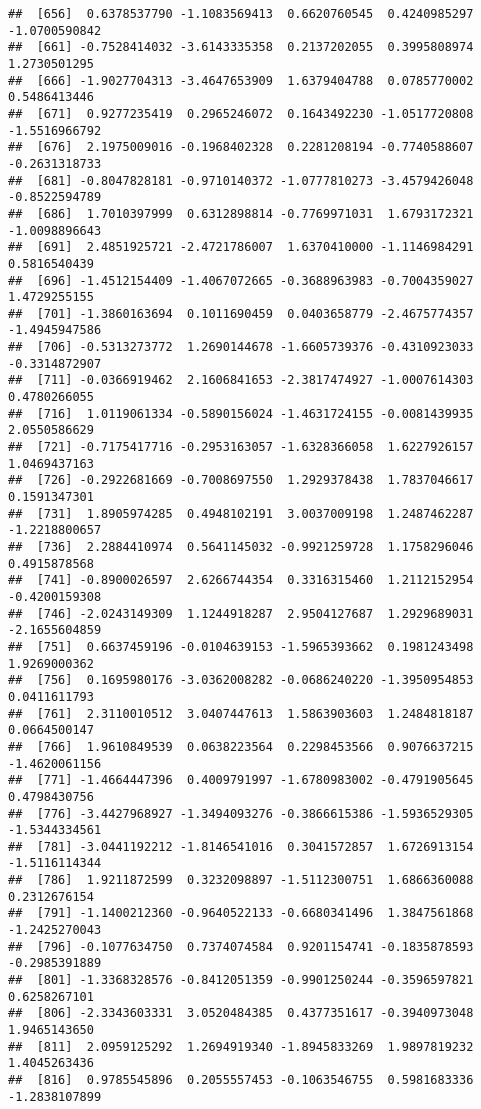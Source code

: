 \documentclass[
]{article}
\begin{document}
\begin{verbatim}
##  [656]  0.6378537790 -1.1083569413  0.6620760545  0.4240985297 -1.0700590842
##  [661] -0.7528414032 -3.6143335358  0.2137202055  0.3995808974  1.2730501295
##  [666] -1.9027704313 -3.4647653909  1.6379404788  0.0785770002  0.5486413446
##  [671]  0.9277235419  0.2965246072  0.1643492230 -1.0517720808 -1.5516966792
##  [676]  2.1975009016 -0.1968402328  0.2281208194 -0.7740588607 -0.2631318733
##  [681] -0.8047828181 -0.9710140372 -1.0777810273 -3.4579426048 -0.8522594789
##  [686]  1.7010397999  0.6312898814 -0.7769971031  1.6793172321 -1.0098896643
##  [691]  2.4851925721 -2.4721786007  1.6370410000 -1.1146984291  0.5816540439
##  [696] -1.4512154409 -1.4067072665 -0.3688963983 -0.7004359027  1.4729255155
##  [701] -1.3860163694  0.1011690459  0.0403658779 -2.4675774357 -1.4945947586
##  [706] -0.5313273772  1.2690144678 -1.6605739376 -0.4310923033 -0.3314872907
##  [711] -0.0366919462  2.1606841653 -2.3817474927 -1.0007614303  0.4780266055
##  [716]  1.0119061334 -0.5890156024 -1.4631724155 -0.0081439935  2.0550586629
##  [721] -0.7175417716 -0.2953163057 -1.6328366058  1.6227926157  1.0469437163
##  [726] -0.2922681669 -0.7008697550  1.2929378438  1.7837046617  0.1591347301
##  [731]  1.8905974285  0.4948102191  3.0037009198  1.2487462287 -1.2218800657
##  [736]  2.2884410974  0.5641145032 -0.9921259728  1.1758296046  0.4915878568
##  [741] -0.8900026597  2.6266744354  0.3316315460  1.2112152954 -0.4200159308
##  [746] -2.0243149309  1.1244918287  2.9504127687  1.2929689031 -2.1655604859
##  [751]  0.6637459196 -0.0104639153 -1.5965393662  0.1981243498  1.9269000362
##  [756]  0.1695980176 -3.0362008282 -0.0686240220 -1.3950954853  0.0411611793
##  [761]  2.3110010512  3.0407447613  1.5863903603  1.2484818187  0.0664500147
##  [766]  1.9610849539  0.0638223564  0.2298453566  0.9076637215 -1.4620061156
##  [771] -1.4664447396  0.4009791997 -1.6780983002 -0.4791905645  0.4798430756
##  [776] -3.4427968927 -1.3494093276 -0.3866615386 -1.5936529305 -1.5344334561
##  [781] -3.0441192212 -1.8146541016  0.3041572857  1.6726913154 -1.5116114344
##  [786]  1.9211872599  0.3232098897 -1.5112300751  1.6866360088  0.2312676154
##  [791] -1.1400212360 -0.9640522133 -0.6680341496  1.3847561868 -1.2425270043
##  [796] -0.1077634750  0.7374074584  0.9201154741 -0.1835878593 -0.2985391889
##  [801] -1.3368328576 -0.8412051359 -0.9901250244 -0.3596597821  0.6258267101
##  [806] -2.3343603331  3.0520484385  0.4377351617 -0.3940973048  1.9465143650
##  [811]  2.0959125292  1.2694919340 -1.8945833269  1.9897819232  1.4045263436
##  [816]  0.9785545896  0.2055557453 -0.1063546755  0.5981683336 -1.2838107899

\end{verbatim}
\end{document}

